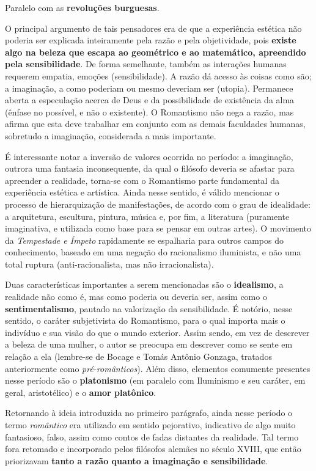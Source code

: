 \documentclass[12pt]{book}
\begin{document}
		\par Paralelo com as \textbf{revoluções burguesas}.
		\par O principal argumento de tais pensadores era de que a experiência estética não poderia ser explicada inteiramente pela razão e pela objetividade, pois \textbf{existe algo na beleza que escapa ao geométrico e ao matemático, apreendido pela sensibilidade}. De forma semelhante, também as interações humanas requerem empatia, emoções (sensibilidade). A razão dá acesso às coisas como são; a imaginação, a como poderiam ou mesmo deveriam ser (utopia). Permanece aberta a especulação acerca de Deus e da possibilidade de existência da alma (ênfase no possível, e não o existente). O Romantismo não nega a razão, mas afirma que esta deve trabalhar em conjunto com as demais faculdades humanas, sobretudo a imaginação, considerada a mais importante.
		\par É interessante notar a inversão de valores ocorrida no período: a imaginação, outrora uma fantasia inconsequente, da qual o filósofo deveria se afastar para apreender a realidade, torna-se com o Romantismo parte fundamental da experiência estética e artística. Ainda nesse sentido, é válido mencionar o processo de hierarquização de manifestações, de acordo com o grau de idealidade: a arquitetura, escultura, pintura, música e, por fim, a literatura (puramente imaginativa, e utilizada como base para se pensar em outras artes). O movimento da \textit{Tempestade e Ímpeto} rapidamente se espalharia para outros campos do conhecimento, baseado em uma negação do racionalismo iluminista, e não uma total ruptura (anti-racionalista, mas não irracionalista).
		\par Duas características importantes a serem mencionadas são o \textbf{idealismo}, a realidade não como é, mas como poderia ou deveria ser, assim como o \textbf{sentimentalismo}, pautado na valorização da sensibilidade. É notório, nesse sentido, o caráter subjetivista do Romantismo, para o qual importa mais o indivíduo e sua visão do que o mundo exterior. Assim sendo, em vez de descrever a beleza de uma mulher, o autor se preocupa em descrever como se sente em relação a ela (lembre-se de Bocage e Tomás Antônio Gonzaga, tratados anteriormente como \textit{pré-românticos}). Além disso, elementos comumente presentes nesse período são o \textbf{platonismo} (em paralelo com Iluminismo e seu caráter, em geral, aristotélico) e o \textbf{amor platônico}.
		\par Retornando à ideia introduzida no primeiro parágrafo, ainda nesse período o termo \textit{romântico} era utilizado em sentido pejorativo, indicativo de algo muito fantasioso, falso, assim como contos de fadas distantes da realidade. Tal termo fora retomado e incorporado pelos filósofos alemães no século XVIII, que então priorizavam \textbf{tanto a razão quanto a imaginação e sensibilidade}.
\end{document}
